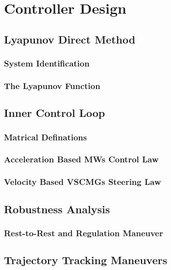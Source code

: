 \chapter{Controller Design}
\section{Lyapunov Direct Method}
\subsection{System Identification}
\subsection{The Lyapunov Function}
\section{Inner Control Loop}
\subsection{Matrical Definations}
\subsection{Acceleration Based MWs Control Law}
\subsection{Velocity Based VSCMGs Steering Law}
\section{Robustness Analysis}
\subsection{Rest-to-Rest and Regulation Maneuver}
\section{Trajectory Tracking Maneuvers}
